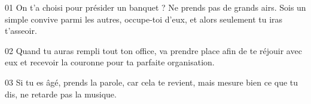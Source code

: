 01 On t’a choisi pour présider un banquet ? Ne prends pas de grands airs. Sois un simple convive parmi les autres, occupe-toi d’eux, et alors seulement tu iras t’asseoir.

02 Quand tu auras rempli tout ton office, va prendre place afin de te réjouir avec eux et recevoir la couronne pour ta parfaite organisation.

03 Si tu es âgé, prends la parole, car cela te revient, mais mesure bien ce que tu dis, ne retarde pas la musique.
